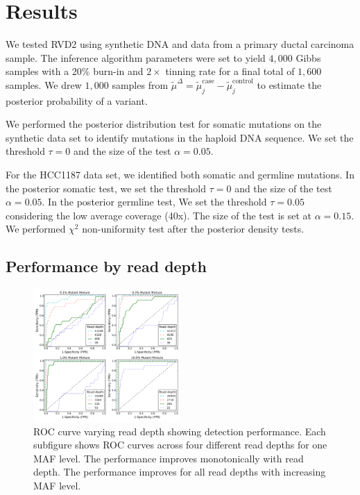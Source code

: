 \documentclass{bioinfo}
\begin{document}
\section{Results}

We tested RVD2 using synthetic DNA and data from a primary ductal carcinoma sample. The inference algorithm parameters were set to yield $4,000$ Gibbs samples with a 20\% burn-in and $2\times$ tinning rate for a final total of $1,600$ samples. We drew $1,000$ samples from $ \tilde{\mu}^{\Delta} =  \tilde{\mu}_j^{\text{case}} - \tilde{\mu}_j^{\text{control}}$ to estimate the posterior probability of a variant.

We performed the posterior distribution test for somatic mutations on the synthetic data set to identify mutations in the haploid DNA sequence. We set the threshold $ \tau =0 $ and the size of the test $ \alpha = 0.05$. 

For the HCC1187 data set, we identified both somatic and germline mutations. In the posterior somatic test, we set the threshold $ \tau =0 $ and the size of the test $ \alpha = 0.05$. In the posterior germline test, We set  the threshold $ \tau =0.05 $ considering the low average coverage (40x). The size of the test is set at $ \alpha = 0.15$. We performed $ \chi^2 $ non-uniformity test after the posterior density tests.

\subsection{Performance by read depth}\label{sec:read_depth}

\begin{figure}[htbp]
\begin{center}
\includegraphics[width=0.5\textwidth]{pdf_figs/ROC_without_chi2.pdf}
\caption{ROC curve varying read depth showing detection performance. Each subfigure shows ROC curves across four different read depths for one MAF level. The performance improves monotonically with read depth. The performance improves for all read depths with increasing MAF level.}
\label{fig:ROC}
\end{center}
\end{figure}
\end{document}
